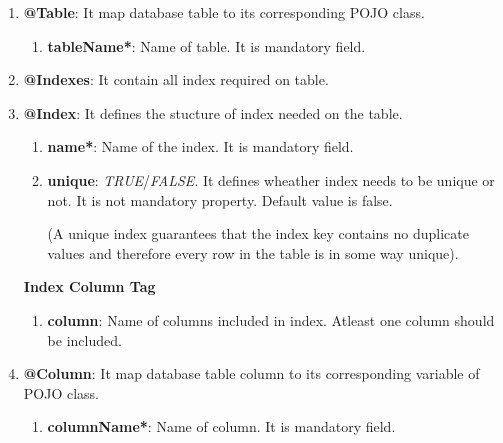 \begin{enumerate}

	\item \small \textbf{@Table}: It map database table to its corresponding POJO class.
		
		\begin{enumerate}

			\item \small \textbf{tableName*}: Name of table. It is mandatory field.

		\end{enumerate}
	

	\item \small \textbf{@Indexes}: It contain all index required on table.


	\item \small \textbf{@Index}: It defines the stucture of  index needed on the table.

		\begin{enumerate}

			\item \small \textbf{name*}: Name of the index. It is mandatory field.
			\item \small \textbf{unique}: \textit{TRUE}/\textit{FALSE}. It defines wheather index needs to be unique or not. It is not mandatory property. Default value is false.
				
				\par
				(A unique index guarantees that the index key contains no duplicate values and therefore every row in the table is in some way unique). 


		\end{enumerate}

		
		\par
		\textbf{Index Column Tag}

		\begin{enumerate}

			\item \small \textbf{column}: Name of columns included in index. Atleast one column should be included.

		\end{enumerate}

	\item \small \textbf{@Column}: It map database table column to its corresponding variable of POJO class.

		\begin{enumerate}

			\item \small \textbf{columnName*}: Name of column. It is mandatory field.


\end{enumerate}
\end{enumerate}
